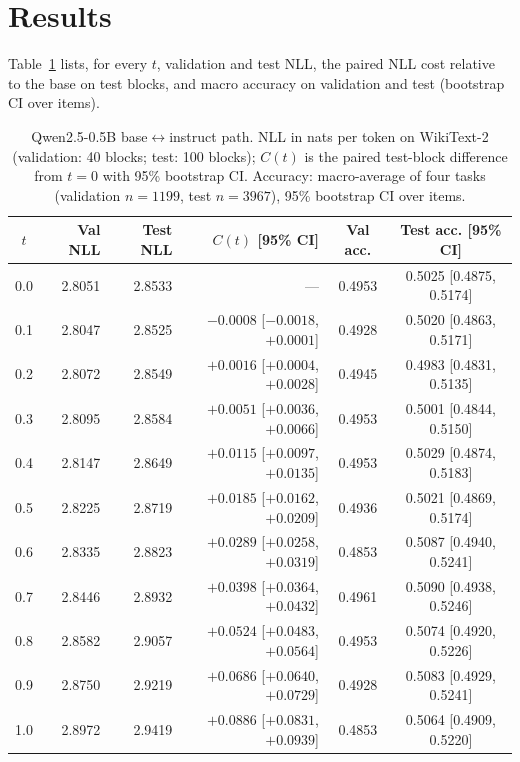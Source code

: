 \documentclass[conference]{IEEEtran}
\begin{document}
\section{Results}
Table~\ref{tab:frontier} lists, for every $t$, validation and test NLL, the paired NLL cost relative to the base on test blocks, and macro accuracy on validation and test (bootstrap CI over items).

\begin{table}[!t]
\caption{Qwen2.5-0.5B base$\leftrightarrow$instruct path. NLL in nats per token on WikiText-2 (validation: 40 blocks; test: 100 blocks); $C(t)$ is the paired test-block difference from $t=0$ with 95\% bootstrap CI. Accuracy: macro-average of four tasks (validation $n=1199$, test $n=3967$), 95\% bootstrap CI over items.}
\label{tab:frontier}
\centering
\small
\begin{tabular}{crrrcc}
\toprule
$t$ & Val NLL & Test NLL & $C(t)$ [95\% CI] & Val acc. & Test acc. [95\% CI] \\
\midrule
0.0 & 2.8051 & 2.8533 & --- & 0.4953 & 0.5025 [0.4875, 0.5174] \\
0.1 & 2.8047 & 2.8525 & $-0.0008$ [$-0.0018$, $+0.0001$] & 0.4928 & 0.5020 [0.4863, 0.5171] \\
0.2 & 2.8072 & 2.8549 & $+0.0016$ [$+0.0004$, $+0.0028$] & 0.4945 & 0.4983 [0.4831, 0.5135] \\
0.3 & 2.8095 & 2.8584 & $+0.0051$ [$+0.0036$, $+0.0066$] & 0.4953 & 0.5001 [0.4844, 0.5150] \\
0.4 & 2.8147 & 2.8649 & $+0.0115$ [$+0.0097$, $+0.0135$] & 0.4953 & 0.5029 [0.4874, 0.5183] \\
0.5 & 2.8225 & 2.8719 & $+0.0185$ [$+0.0162$, $+0.0209$] & 0.4936 & 0.5021 [0.4869, 0.5174] \\
0.6 & 2.8335 & 2.8823 & $+0.0289$ [$+0.0258$, $+0.0319$] & 0.4853 & 0.5087 [0.4940, 0.5241] \\
0.7 & 2.8446 & 2.8932 & $+0.0398$ [$+0.0364$, $+0.0432$] & 0.4961 & 0.5090 [0.4938, 0.5246] \\
0.8 & 2.8582 & 2.9057 & $+0.0524$ [$+0.0483$, $+0.0564$] & 0.4953 & 0.5074 [0.4920, 0.5226] \\
0.9 & 2.8750 & 2.9219 & $+0.0686$ [$+0.0640$, $+0.0729$] & 0.4928 & 0.5083 [0.4929, 0.5241] \\
1.0 & 2.8972 & 2.9419 & $+0.0886$ [$+0.0831$, $+0.0939$] & 0.4853 & 0.5064 [0.4909, 0.5220] \\
\bottomrule
\end{tabular}
\end{table}
\end{document}
